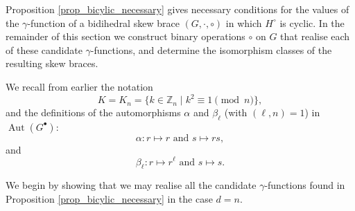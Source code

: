 \documentclass[reqno]{amsart}
\theoremstyle{definition}
\newcommand{\Z}{\mathbb{Z}}
\DeclareMathOperator{\Aut}{\mbox{Aut}}
\begin{document}
Proposition \ref{prop_bicylic_necessary} gives necessary conditions for the values of the $ \gamma $-function of a bidihedral skew brace $ (G,\cdot,\circ) $ in which $ H^{\circ} $ is cyclic. In the remainder of this section we construct binary operations $ \circ $ on $ G $ that realise each of these candidate $ \gamma $-functions, and determine the isomorphism classes of the resulting skew braces. 

We recall from earlier the notation 
\[ K = K_{n} = \{ k \in \Z_{n} \mid k^{2} \equiv 1 \pmod{n} \}, \]
and the definitions of the automorphisms $ \alpha $ and $ \beta_{\ell} $ (with $ (\ell,n)=1 $) in $ \Aut(G^{\bullet}) $:
\[ \alpha : r \mapsto r \mbox{ and } s \mapsto rs, \]
and 
\[ \beta_{\ell} : r \mapsto r^{\ell} \mbox{ and } s \mapsto s. \] 

We begin by showing that we may realise all the candidate $ \gamma $-functions found in Proposition \ref{prop_bicylic_necessary} in the case $ d=n $. 
\end{document}
